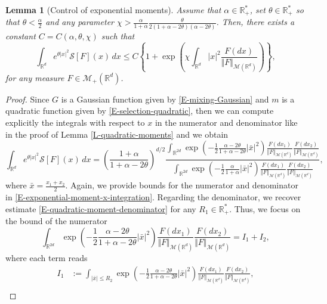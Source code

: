 \documentclass[reqno]{amsart}
\newtheorem{lemma}[definition]{Lemma}
\numberwithin{equation}{section}
\begin{document}
{\begin{lemma}[Control of exponential moments]\label{L-exponential-moments}
Assume that $\alpha\in \mathbb{R}_+^*$, set $\theta\in \mathbb{R}_+^*$ so that $\theta<\frac{\alpha}{2}$ and any parameter $\chi>\frac{\alpha}{1+\alpha}\frac{\theta}{2(1+\alpha-2\theta)(\alpha-2\theta)}$. Then, there exists a constant $C=C(\alpha,\theta,\chi)$ such that
$$\int_{\mathbb{R}^d}e^{\theta\vert x\vert^2} \mathcal{S}[F](x)\,dx\leq C\left\{1+\exp\left(\chi \int_{\mathbb{R}^d}\vert x\vert^2\frac{F(dx)}{\Vert F\Vert_{\mathcal{M}(\mathbb{R}^d)}}\right)\right\},$$
for any measure $F\in \mathcal{M}_+(\mathbb{R}^d)$.
\end{lemma}

\begin{proof}
Since $G$ is a Gaussian function given by  \eqref{E-mixing-Gaussian} and $m$ is a quadratic function given by \eqref{E-selection-quadratic}, then we can compute explicitly the integrals with respect to $x$ in the numerator and denominator like in the proof of Lemma \ref{L-quadratic-moments} and we obtain
\begin{equation}\label{E-exponential-moment-x-integration}
\int_{\mathbb{R}^d}e^{\theta \vert x\vert^2}\mathcal{S}[F](x)\,dx=\left(\frac{1+\alpha}{1+\alpha-2\theta}\right)^{d/2}\frac{\displaystyle\int_{\mathbb{R}^{2d}}\exp\left(-\frac{1}{2}\frac{\alpha-2\theta}{1+\alpha-2\theta}\vert \bar x\vert^2\right)\frac{F(dx_1)}{\Vert F\Vert_{\mathcal{M}(\mathbb{R}^d)}}\frac{F(dx_2)}{\Vert F\Vert_{\mathcal{M}(\mathbb{R}^d)}}}{\displaystyle\int_{\mathbb{R}^{2d}}\exp\left(-\frac{1}{2}\frac{\alpha}{1+\alpha}\vert \bar x\vert^2\right)\frac{F(dx_1)}{\Vert F\Vert_{\mathcal{M}(\mathbb{R}^d)}}\frac{F(dx_2)}{\Vert F\Vert_{\mathcal{M}(\mathbb{R}^d)}}},
\end{equation}
where $\bar x=\frac{x_1+x_2}{2}$. Again, we provide bounds for the numerator and denominator in \eqref{E-exponential-moment-x-integration}. Regarding the denominator, we recover estimate \eqref{E-quadratic-moment-denominator} for any $R_1\in \mathbb{R}_+^*$. Thus, we focus on the bound of the numerator
$$\int_{\mathbb{R}^{2d}}\exp\left(-\frac{1}{2}\frac{\alpha-2\theta}{1+\alpha-2\theta}\vert \bar x\vert^2\right)\frac{F(dx_1)}{\Vert F\Vert_{\mathcal{M}(\mathbb{R}^d)}}\frac{F(dx_2)}{\Vert F\Vert_{\mathcal{M}(\mathbb{R}^d)}}=I_1+I_2,$$
where each term reads
\begin{align*}
I_1&:=\int_{\vert \bar x\vert\leq R_2}\exp\left(-\frac{1}{2}\frac{\alpha-2\theta}{1+\alpha-2\theta}\vert \bar x\vert^2\right)\frac{F(dx_1)}{\Vert F\Vert_{\mathcal{M}(\mathbb{R}^d)}}\frac{F(dx_2)}{\Vert F\Vert_{\mathcal{M}(\mathbb{R}^d)}},\\

\end{align*}
\end{proof}}
\end{document}
